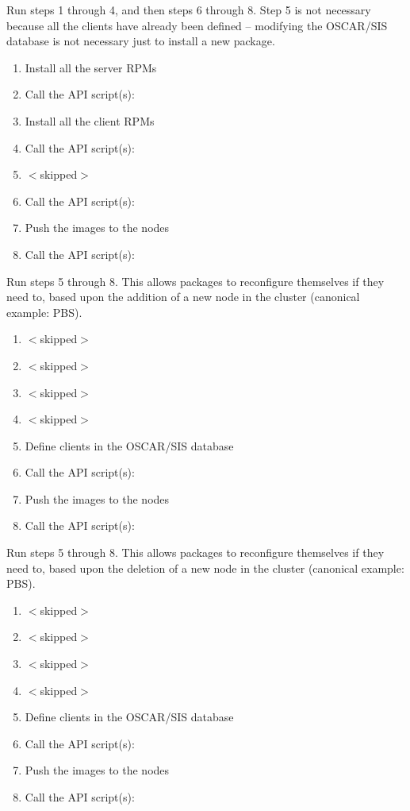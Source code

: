 
Run steps 1 through 4, and then steps 6 through 8.  Step 5 is not
necessary because all the clients have already been defined --
modifying the OSCAR/SIS database is not necessary just to install a
new package.

\begin{enumerate}
\item Install all the server RPMs
\item Call the API script(s): 
\item Install all the client RPMs
\item Call the API script(s): 
\item $<$skipped$>$
\item Call the API script(s): 
\item Push the images to the nodes
\item Call the API script(s): 
\end{enumerate}


Run steps 5 through 8.  This allows packages to reconfigure themselves
if they need to, based upon the addition of a new node in the cluster
(canonical example: PBS).

\begin{enumerate}
\item $<$skipped$>$
\item $<$skipped$>$
\item $<$skipped$>$
\item $<$skipped$>$
\item Define clients in the OSCAR/SIS database
\item Call the API script(s): 
\item Push the images to the nodes
\item Call the API script(s): 
\end{enumerate}



Run steps 5 through 8.  This allows packages to reconfigure themselves
if they need to, based upon the deletion of a new node in the cluster
(canonical example: PBS).

\begin{enumerate}
\item $<$skipped$>$
\item $<$skipped$>$
\item $<$skipped$>$
\item $<$skipped$>$
\item Define clients in the OSCAR/SIS database
\item Call the API script(s): 
\item Push the images to the nodes
\item Call the API script(s): 
\end{enumerate}


